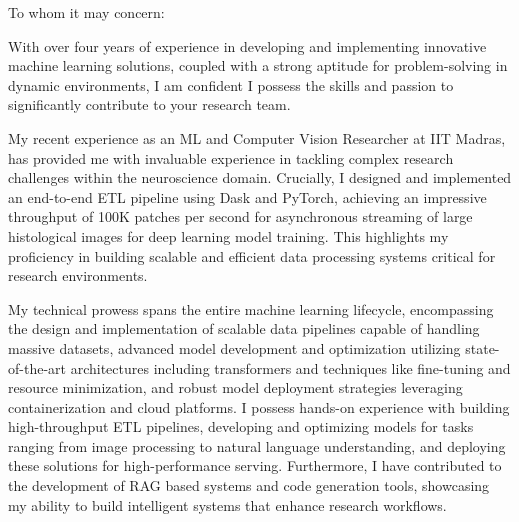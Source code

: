 \documentclass{ExpressiveCoverLetter}
\begin{document}
\coverletterheader[
	firstname=Risan Raja,
	middleinitial=,
	lastname=,
	email=risan.raja@icloud.com,
	linkedin=risanraja,
	github=risan-raja,
]

\vspace{0.15in}

To whom it may concern:

With over four years of experience in developing and implementing
innovative machine learning solutions, coupled with a strong aptitude 
for problem-solving in dynamic environments, I am confident I possess 
the skills and passion to significantly contribute to your research team.

My recent experience as an ML and Computer Vision Researcher at IIT Madras, has provided me 
 with invaluable experience in tackling complex research challenges 
 within the neuroscience domain. Crucially, I designed and implemented an end-to-end ETL 
 pipeline using Dask and PyTorch, achieving an impressive throughput of 
 100K patches per second for asynchronous streaming of large
 histological images for deep learning model training. This highlights 
 my proficiency in building scalable and efficient data processing
 systems critical for research environments.

 My technical prowess spans the entire machine learning lifecycle, 
 encompassing the design and implementation of scalable data pipelines 
 capable of handling massive datasets, advanced model development and 
 optimization utilizing state-of-the-art architectures including 
 transformers and techniques like fine-tuning and resource minimization, 
 and robust model deployment strategies leveraging containerization and 
 cloud platforms. I possess hands-on experience with building
 high-throughput ETL pipelines, developing and optimizing models for 
 tasks ranging from image processing to natural language understanding, 
 and deploying these solutions for high-performance serving.
 Furthermore, I have contributed to the development of RAG based systems 
 and code generation tools, showcasing my ability to build intelligent
 systems that enhance research workflows.
\end{document}
